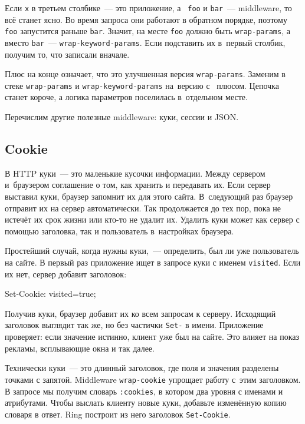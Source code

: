 \fi

Если \verb|x| в третьем столбике~--- это приложение, а~ \verb|foo| и
\verb|bar|~--- middleware, то всё станет ясно. Во время запроса они работают в
обратном порядке, поэтому \verb|foo| запустится раньше \verb|bar|. Значит,
на месте \verb|foo| должно быть \verb|wrap-params|, а вместо
\verb|bar|~--- \verb|wrap-keyword-params|. Если подставить их в~первый
столбик, получим то, что записали вначале.

Плюс на конце означает, что это улучшенная версия \verb|wrap-params|. Заменим
в стеке \verb|wrap-params| и \verb|wrap-keyword-params| на~версию с~
плюсом. Цепочка станет короче, а логика параметров поселилась в~отдельном месте.

Перечислим другие полезные middleware: куки, сессии и JSON.

\subsection{Cookie}


В HTTP куки~--- это маленькие кусочки информации. Между сервером и~браузером
соглашение о том, как хранить и передавать их. Если сервер выставил куки,
браузер запомнит их для этого сайта. В~следующий раз браузер отправит их на
сервер автоматически. Так продолжается до тех пор, пока не истечёт их срок
жизни или кто-то не удалит их. Удалить куки может как сервер с помощью
заголовка, так и пользователь в~настройках браузера.

Простейший случай, когда нужны куки,~--- определить, был ли уже пользователь на
сайте. В первый раз приложение ищет в запросе куки с именем
\verb|visited|. Если их нет, сервер добавит заголовок:

\begin{english}
  \begin{http}
Set-Cookie: visited=true;
  \end{http}
\end{english}

Получив куки, браузер добавит их ко всем запросам к серверу. Исходящий заголовок
выглядит так же, но без частички \verb|Set-| в имени. Приложение проверяет: если
значение истинно, клиент уже был на сайте. Это влияет на показ рекламы,
всплывающие окна и так далее.

Технически куки~--- это длинный заголовок, где поля и значения разделены точками с
запятой. Middleware \verb|wrap-cookie| упрощает работу с~этим заголовком. В
запросе мы получим словарь \verb|:cookies|, в котором два уровня с именами и
атрибутами. Чтобы выслать клиенту новые куки, добавьте изменённую копию словаря
в ответ. Ring построит из него заголовок \verb|Set-Cookie|.


